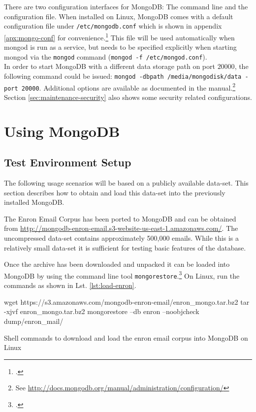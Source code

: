 There are two configuration interfaces for MongoDB: The command line and the
configuration file.
When installed on Linux, MongoDB comes with a default configuration file under
\texttt{/etc/mongodb.conf} which is shown in appendix \ref{apx:mongo-conf} for
convenience.\footcite[Cf.][]{mongo_config} This file will be used automatically
when mongod is run as a service, but needs to be specified explicitly when
starting mongod via the \texttt{mongod} command (\texttt{mongod -f
/etc/mongod.conf}).\\
In order to start MongoDB with a different data storage path on port $20000$,
the following command could be issued:  \texttt{mongod -dbpath /media/mongodisk/data
-port 20000}.
Additional options are available as documented in the manual.\footnote{See
\url{http://docs.mongodb.org/manual/administration/configuration/}} Section
\ref{sec:maintenance-security} also shows some security related configurations.

    
\newpage
\section{Using MongoDB}
\label{sec:usage}

\subsection{Test Environment Setup}
\label{sec:test-environment}

The following usage scenarios will be based on a publicly available data-set.
This section describes how to obtain and load this data-set into the previously
installed MongoDB.

The Enron Email Corpus has been ported to MongoDB and can be obtained from
\url{http://mongodb-enron-email.s3-website-us-east-1.amazonaws.com/}.
The uncompressed data-set contains approximately 500,000 emails.
While this is a relatively small data-set it is sufficient for
testing basic features of the database.

Once the archive has been downloaded and unpacked it can be loaded into MongoDB
by using the command line tool
\texttt{mongorestore}.\footcite[Cf.][]{mongo_restore}
 On Linux, run the commands as shown in Lst. \ref{lst:load-enron}.

\begin{listing}
    \begin{bashcode}
    wget https://s3.amazonaws.com/mongodb-enron-email/enron_mongo.tar.bz2
    tar -xjvf enron_mongo.tar.bz2
    mongorestore --db enron --noobjcheck dump/enron_mail/
    \end{bashcode}
    \caption{Shell commands to download and load the enron email corpus into MongoDB on Linux}
    \label{lst:load-enron}
\end{listing}

